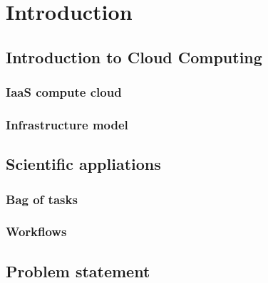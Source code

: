 \chapter{Introduction}
\label{chap:introduction} 


\section{Introduction to Cloud Computing}

\subsection{IaaS compute cloud}

\subsection{Infrastructure model}

\section{Scientific appliations}

\subsection{Bag of tasks}

\subsection{Workflows}

\section{Problem statement}

